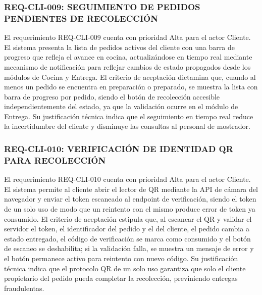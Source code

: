\subsubsection{REQ-CLI-009: SEGUIMIENTO DE PEDIDOS PENDIENTES DE RECOLECCIÓN}
El requerimiento REQ-CLI-009 cuenta con prioridad Alta para el actor Cliente. El sistema presenta la lista de pedidos activos del cliente con una barra de progreso que refleja el avance en cocina, actualizándose en tiempo real mediante mecanismo de notificación para reflejar cambios de estado propagados desde los módulos de Cocina y Entrega. El criterio de aceptación dictamina que, cuando al menos un pedido se encuentra en preparación o preparado, se muestra la lista con barra de progreso por pedido, siendo el botón de recolección accesible independientemente del estado, ya que la validación ocurre en el módulo de Entrega. Su justificación técnica indica que el seguimiento en tiempo real reduce la incertidumbre del cliente y disminuye las consultas al personal de mostrador.

\subsubsection{REQ-CLI-010: VERIFICACIÓN DE IDENTIDAD QR PARA RECOLECCIÓN}
El requerimiento REQ-CLI-010 cuenta con prioridad Alta para el actor Cliente. El sistema permite al cliente abrir el lector de QR mediante la API de cámara del navegador y enviar el token escaneado al endpoint de verificación, siendo el token de un solo uso de modo que un reintento con el mismo produce error de token ya consumido. El criterio de aceptación estipula que, al escanear el QR y validar el servidor el token, el identificador del pedido y el del cliente, el pedido cambia a estado entregado, el código de verificación se marca como consumido y el botón de escaneo se deshabilita; si la validación falla, se muestra un mensaje de error y el botón permanece activo para reintento con nuevo código. Su justificación técnica indica que el protocolo QR de un solo uso garantiza que solo el cliente propietario del pedido pueda completar la recolección, previniendo entregas fraudulentas.


